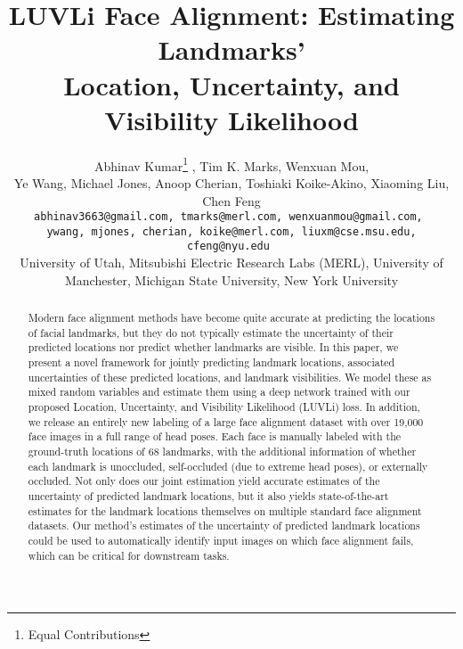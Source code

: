 \documentclass[10pt,twocolumn,letterpaper]{article}
\newcommand{\1}{{\bf 1}}
\newcommand{\0}{{\bf 0}}
\begin{document}
\setlength{\abovedisplayskip}{0.075cm}\setlength{\belowdisplayskip}{0.075cm}\setlength{\abovedisplayshortskip}{0.075cm}\setlength{\belowdisplayshortskip}{0.075cm}

\title{LUVLi Face Alignment: Estimating Landmarks'\\
Location, Uncertainty, and Visibility Likelihood}

\author{Abhinav Kumar\thanks{Equal Contributions} , Tim K. Marks\footnotemark[1]  , Wenxuan Mou\footnotemark[1] ,\\ Ye Wang, Michael Jones, Anoop Cherian, Toshiaki Koike-Akino, Xiaoming Liu, Chen Feng\\
{\tt\small abhinav3663@gmail.com, tmarks@merl.com, wenxuanmou@gmail.com, }\\
{\tt\small ywang, mjones, cherian, koike@merl.com, liuxm@cse.msu.edu, cfeng@nyu.edu }\\
{\footnotesize University of Utah, Mitsubishi Electric Research Labs (MERL),  University of Manchester, Michigan State University, New York University}
}


\maketitle
\thispagestyle{empty}

\begin{abstract}
Modern face alignment methods have become quite accurate at predicting the locations of facial landmarks, but they do not typically estimate the uncertainty of their predicted locations nor predict whether landmarks are visible. In this paper, we present a novel framework for jointly predicting landmark locations, associated uncertainties of these predicted locations, and landmark visibilities. We model these as mixed random variables and estimate them using a deep network trained with our proposed Location, Uncertainty, and Visibility Likelihood (LUVLi) loss. In addition, we release an entirely new labeling of a large face alignment dataset with over 19,000 face images in a full range of head poses. Each face is manually labeled with the ground-truth locations of 68 landmarks, with the additional information of whether each landmark is unoccluded, self-occluded (due to extreme head poses), or externally occluded. Not only does our joint estimation yield accurate estimates of the uncertainty of predicted landmark locations, but it also yields state-of-the-art estimates for the landmark locations themselves on multiple standard face alignment datasets. Our method's estimates of the uncertainty of predicted landmark locations could be used to automatically identify input images on which face alignment fails, which can be critical for downstream tasks.
\end{abstract}
\end{document}
